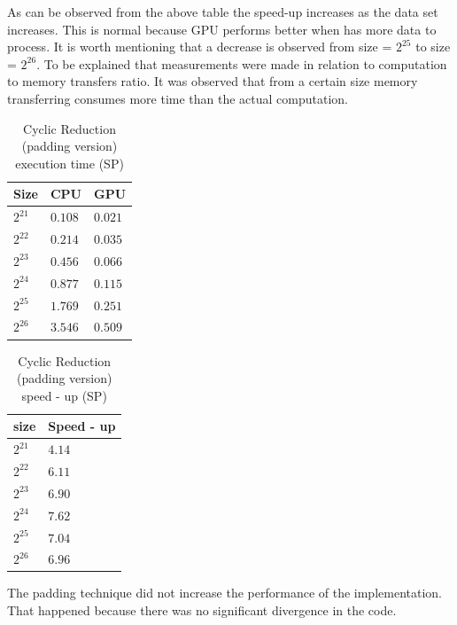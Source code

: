As can be observed from the above table the speed-up increases as the data set increases.
This is normal because GPU performs better when has more data to process. It is worth mentioning
that a decrease is observed from size = $2^25$ to size = $2^26$. To be explained that measurements were made in relation to computation to memory transfers ratio. It was observed that from a certain size memory transferring 
consumes more time than the actual computation.

\begin{table}[H]
\caption{Cyclic Reduction (padding version) execution time (SP)} 
\centering 
\begin{tabular}{| l | p{3cm} | p{3cm} |} 
\hline\hline 
Size & CPU & GPU  \\ [0.8ex] 
\hline 
$2^{21}$ & $0.108$ & $0.021$\\ 
$2^{22}$ & $0.214$ & $0.035$\\
$2^{23}$ & $0.456$ & $0.066$\\
$2^{24}$ & $0.877$ & $0.115$\\
$2^{25}$ & $1.769$ & $0.251$ \\ 
$2^{26}$ & $3.546$ & $0.509$ \\[1ex] 
\hline 
\end{tabular}
\label{table:cr_padding} 
\end{table}



\begin{table}[H]
\caption{Cyclic Reduction (padding version) speed - up (SP)} 
\centering 
\begin{tabular}{| l | p{3cm} |} 
\hline\hline 
size	 & Speed - up  \\  [0.8ex] 
\hline        
        $2^{21}$ & $4.14$      \\ 	
        $2^{22}$ & $6.11$     \\ 	
        $2^{23}$ & $6.90$      \\ 
        $2^{24}$ & $7.62$    \\ 
        $2^{25}$ & $7.04$     \\ 
        $2^{26}$ & $6.96$       \\ [1ex] 
        \hline
\end{tabular}
\label{table:cr_padding_spup} 
\end{table}

The padding technique did not increase the performance of the implementation. That happened because  there was no significant divergence in the code.


